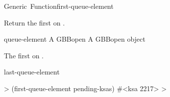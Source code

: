 \documentclass[10pt,twoside,english,pdftex]{article}
\begin{document}

\begin{functiondoc}{Generic~Function}{first-queue-element}{
    \returns{} }
%
%

\fnsyntax

\fnpurpose Return the first  on .

\fnmethods
{}

\fnpackage {}

\fnmodule {}

\fnargs
\begin{args}{queue-element}
\arg[queue] A GBBopen 
 A GBBopen  object
\end{args}

\fnreturns The first  on .
  
\begin{alsos}{last-queue-element}
\end{alsos}

\fnexample
%
\W\supp
\begin{example}
  > (first-queue-element pending-ksas)
  #<ksa 2217>
  >
\end{example}

\end{functiondoc}

\end{document}

